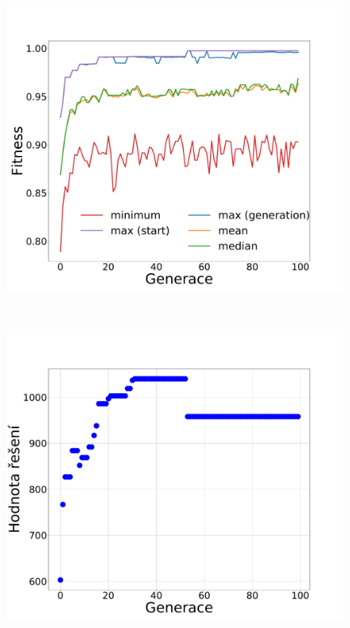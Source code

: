 \documentclass[11pt]{article}
\begin{document}
\begin{figure}
\begin{minipage}[c]{0.32\textwidth}
        \centering \includegraphics[width=\textwidth]{img/1g.pdf} 
    \end{minipage}
    \\
    \begin{minipage}[c]{0.32\textwidth}
        \centering\includegraphics[width=\textwidth]{img/1w.pdf} 
    \end{minipage}
    \begin{minipage}[c]{0.32\textwidth}

\end{minipage}
\end{figure}
\end{document}
